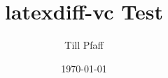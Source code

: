 \documentclass{scrartcl}
\begin{document}
\author{Till Pfaff}
\date{\today}
\title{latexdiff-vc Test}
\maketitle
\lipsum[1-2]
\lipsum[3-4]
\end{document}
